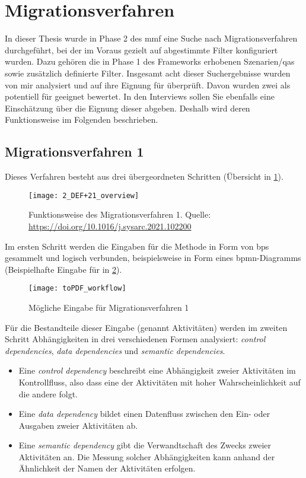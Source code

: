 \section{Migrationsverfahren}

In dieser Thesis wurde in Phase 2 des \gls{mmf} eine Suche nach Migrationsverfahren durchgeführt, bei der im Voraus gezielt auf \jf abgestimmte Filter konfiguriert wurden.
Dazu gehören die in Phase 1 des Frameworks erhobenen Szenarien/\glspl{qa} sowie zusätzlich definierte Filter. 
Insgesamt acht dieser Suchergebnisse wurden von mir analysiert und auf ihre Eignung für \jf überprüft.
Davon wurden zwei als potentiell für \jf geeignet bewertet.
In den Interviews sollen Sie ebenfalls eine Einschätzung über die Eignung dieser abgeben.
Deshalb wird deren Funktionsweise im Folgenden beschrieben.

\subsection{Migrationsverfahren 1}

Dieses Verfahren besteht aus drei übergeordneten Schritten (Übersicht in \cref{fig:interviews-migrationsverfahren1}).
\begin{figure}[!ht]
	\centering
	\texttt{[image: 2\_DEF+21\_overview]}
	\caption[Funktionsweise Migrationsverfahren 1]{
		Funktionsweise des Migrationsverfahren 1. Quelle: \url{https://doi.org/10.1016/j.sysarc.2021.102200}
	}
	\label{fig:interviews-migrationsverfahren1}
\end{figure}
Im ersten Schritt werden die Eingaben für die Methode in Form von \glspl{bp} gesammelt und logisch verbunden, beispielsweise in Form eines \gls{bpmn}-Diagramms (Beispielhafte Eingabe für \jf in \cref{fig:interview-eingabe-verfahren1}).

\begin{figure}[!ht]
	\centering
	\texttt{[image: toPDF\_workflow]}
	\caption[Mögliche Eingabe Migrationsverfahren 1]{
		Mögliche Eingabe für Migrationsverfahren 1
	}
	\label{fig:interview-eingabe-verfahren1}
\end{figure}

Für die Bestandteile dieser Eingabe (genannt Aktivitäten) werden im zweiten Schritt Abhängigkeiten in drei verschiedenen Formen analysiert: \emph{control dependencies}, \emph{data dependencies} und \emph{semantic dependencies}.
\begin{itemize}
	\item Eine \emph{control dependency} beschreibt eine Abhängigkeit zweier Aktivitäten im Kontrollfluss, also dass eine der Aktivitäten mit hoher Wahrscheinlichkeit auf die andere folgt.
	\item Eine \emph{data dependency} bildet einen Datenfluss zwischen den Ein- oder Ausgaben zweier Aktivitäten ab.
	\item Eine \emph{semantic dependency} gibt die Verwandtschaft des Zwecks zweier Aktivitäten an.
	Die Messung solcher Abhängigkeiten kann anhand der Ähnlichkeit der Namen der Aktivitäten erfolgen.
\end{itemize}

